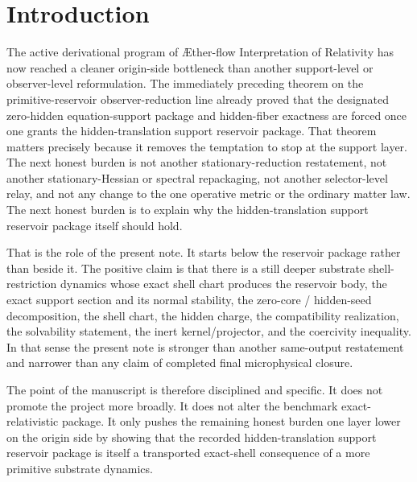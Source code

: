 \documentclass[11pt]{article}
\newcommand{\Aflow}{\AE{}ther-flow}
\newcommand{\TheoryName}{\Aflow{} Interpretation of Relativity}
\begin{document}
\section{Introduction}

The active derivational program of \TheoryName{} has now reached a cleaner origin-side bottleneck than another support-level or observer-level reformulation. The immediately preceding theorem on the primitive-reservoir observer-reduction line already proved that the designated zero-hidden equation-support package and hidden-fiber exactness are forced once one grants the hidden-translation support reservoir package. That theorem matters precisely because it removes the temptation to stop at the support layer. The next honest burden is not another stationary-reduction restatement, not another stationary-Hessian or spectral repackaging, not another selector-level relay, and not any change to the one operative metric or the ordinary matter law. The next honest burden is to explain why the hidden-translation support reservoir package itself should hold.

That is the role of the present note. It starts below the reservoir package rather than beside it. The positive claim is that there is a still deeper substrate shell-restriction dynamics whose exact shell chart produces the reservoir body, the exact support section and its normal stability, the zero-core / hidden-seed decomposition, the shell chart, the hidden charge, the compatibility realization, the solvability statement, the inert kernel/projector, and the coercivity inequality. In that sense the present note is stronger than another same-output restatement and narrower than any claim of completed final microphysical closure.

The point of the manuscript is therefore disciplined and specific. It does not promote the project more broadly. It does not alter the benchmark exact-relativistic package. It only pushes the remaining honest burden one layer lower on the origin side by showing that the recorded hidden-translation support reservoir package is itself a transported exact-shell consequence of a more primitive substrate dynamics.
\end{document}
